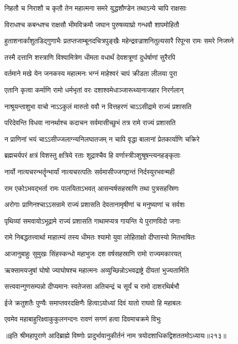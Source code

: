 \twolineshloka
{निहतौ च निराशौ च कृतौ तेन महात्मना}
{समरे युद्धशौण्डेन तथाऽन्ये चापि राक्षसाः} %

\twolineshloka
{विराधश्च कबन्धश्च राक्षसौ भीमविक्रमौ}
{जघान पुरुषव्याघ्रो गन्धवौ शापमोहितौ} %

\twolineshloka
{हुताशनार्कांशुतडिद्‌गुणाभैः प्रतप्तजाम्बूनदचित्रपुङ्खैः}
{महेन्द्रवज्राशनितुल्यसारै रिपून्स रामः समरे निजघ्ने} %

\twolineshloka
{तस्मै दत्तानि शस्त्राणि विश्वामित्रेण धीमता}
{वधार्थं देवशत्रूणां दुर्धर्षाणां सुरैरपि} %

\twolineshloka
{वर्तमाने मखे येन जनकस्य महात्मनः}
{भग्नं माहेश्वरं चापं क्रीडता लीलया पुरा} %

\twolineshloka
{एतानि कृत्वा कर्माणि रामो धर्मभृतां वरः}
{दशाश्वमेधाञ्जारूथ्यानाजहार निरर्गलान्} %

\twolineshloka
{नाश्रूयन्ताशुभा वाचो नाऽऽकुलं मारुतो ववौ}
{न वित्तहरणं चाऽऽसीद्रामे राज्यं प्रशासति} %

\twolineshloka
{परिदेवन्ति विधवा नानर्थाश्च कदाचन}
{सर्वमासीच्छुभं तत्र रामे राज्यं प्रशासति} %

\twolineshloka
{न प्राणिनां भयं चाऽऽसीज्जलाग्न्यनिलघातजम्}
{न चापि वृद्धा बालानां प्रेतकार्याणि चक्रिरे} %

\twolineshloka
{ब्रह्मचर्यपरं क्षत्रं विशस्तु क्षत्रिये रताः}
{शूद्राश्चैव हि वर्णास्त्रीञ्शुश्रूषन्त्यनहङ्कृताः} %

\twolineshloka
{नार्यो नात्यचरन्भर्तॄन्भार्यां नात्यचरत्पतिः}
{सर्वमासीज्जगद्दान्तं निर्दस्युरभवन्मही} %

\twolineshloka
{राम एकोऽभवद्भर्ता रामः पालयिताऽभवत्}
{आसन्वर्षसहस्राणि तथा पुत्रसहस्रिणः} %

\twolineshloka
{अरोगाः प्राणिनश्चाऽऽसन्रामे राज्यं प्रशासति}
{देवतानामृषीणां च मनुष्याणां च सर्वशः} %

\twolineshloka
{पृथिव्यां समवायोऽभूद्रामे राज्यं प्रशासति}
{गाथामप्यत्र गायन्ति ये पुराणविदो जनाः} %

\twolineshloka
{रामे निबद्धतत्त्वार्था माहात्म्यं तस्य धीमतः}
{श्यामो युवा लोहिताक्षो दीप्तास्यो मितभाषितः} %

\twolineshloka
{आजानुबाहुः सुमुखः सिंहस्कन्धो महाभुजः}
{दश वर्षसहस्राणि रामो राज्यमकारयत्} %

\twolineshloka
{ऋक्सामयजुषां घोषो ज्याघोषश्च महात्मनः}
{अव्युच्छिन्नोऽभवद्राष्ट्रे दीयतां भुज्यतामिति} %

\twolineshloka
{सत्त्ववान्गुणसम्पन्नो दीप्यमानः स्वतेजसा}
{अतिचन्द्रं च सूर्यं च रामो दाशरथिर्बभौ} %

\twolineshloka
{ईजे क्रतुशतैः पुण्यैः समाप्तवरदक्षिणैः}
{हित्वाऽयोध्यां दिवं यातो राघवो हि महाबलः} %

\twolineshloka
{एवमेव महाबाहुरिक्ष्वाकुकुलनन्दनः}
{रावणं सगणं हत्वा दिवमाचक्रमे विभुः} %

॥इति श्रीमहापुराणे आदिब्राह्मे विष्णोः प्रादुर्भावानुकीर्तनं नाम त्रयोदशाधिकद्विशततमोऽध्यायः॥२१३॥
